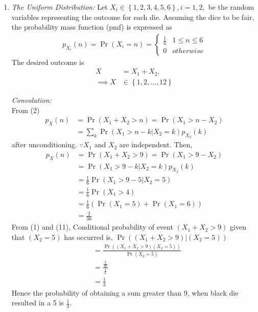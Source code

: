 \documentclass[10pt,twocolumn]{article}
\providecommand{\pr}[1]{\ensuremath{\Pr\left(#1\right)}}
\providecommand{\brak}[1]{\ensuremath{\left(#1\right)}}
\providecommand{\cbrak}[1]{\ensuremath{\left\{#1\right\}}}
\begin{document}
\begin{enumerate}
\item  {\em The Uniform Distribution: }Let $X_i \in \cbrak{1,2,3,4,5,6}, i = 1,2,$ be the random variables representing the outcome for each die.  Assuming the dice to be fair, the probability mass function (pmf) is expressed as 
\begin{align}
p_{X_i}(n) = \pr{X_i = n} = 
\begin{cases}
\frac{1}{6} & 1 \le n \le 6
\\
0 & otherwise
\end{cases}
\end{align}
The desired outcome is
\begin{align}
X &= X_1 + X_2, \\
\implies X &\in \cbrak{1,2,\dots,12}
\end{align}

{\em Convolution: } \\
From (2)
\begin{align}
p_X(n) &= \pr{X_1 + X_2 > n} = \pr{X_1  > n -X_2} \\
&= \sum_{k}^{}\pr{X_1  > n -k | X_2 = k}p_{X_2}(k)
\end{align}
after unconditioning. $\because X_1$ and $X_2$ are independent.
Then,
\begin{align}
p_X(n) &= \pr{X_1 + X_2 > 9} = \pr{X_1  > 9 -X_2} \\
&= \pr{X_1  > 9 -k | X_2 = k}p_{X_2}(k) \\
&= \frac{1}{6} \pr{X_1  > 9 -5 | X_2 = 5} \\
&= \frac{1}{6} \pr{X_1 > 4} \\
&= \frac{1}{6} (\pr{X_1 = 5} + \pr{X_1 = 6}) \\
&= \frac{2}{36}
\end{align}
From (1) and (11), Conditional probability of event $(X_1 + X_2 > 9)$ given that $(X_2 = 5)$ has occurred is,
$\Pr{\brak{\brak{X_1 + X_2 > 9}|\brak{X_2=5}}}$ 
\begin{align}
&=\frac{\Pr{((X_1 + X_2 > 9)(X_2=5))}}{\Pr{\brak{X_2=5}}}\\
&=\frac{\frac{2}{36}}{\frac{1}{6}}\\
&=\frac{1}{3}
\end{align}  
Hence the probability of obtaining a sum greater than 9, when black die resulted in a 5 is $\frac{1}{3}$. 


\end{enumerate}
\end{document}
